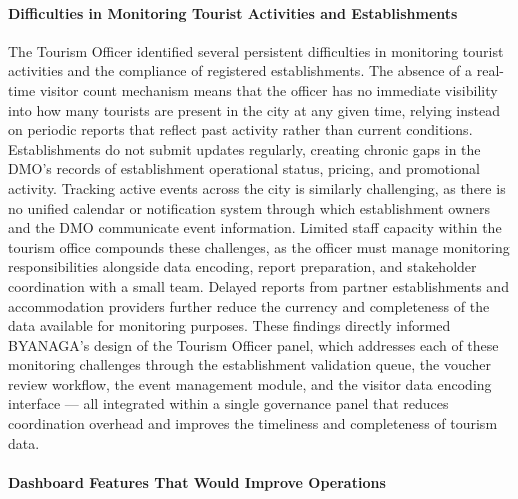 \documentclass{research}
\begin{document}

\paragraph{Difficulties in Monitoring Tourist Activities and Establishments}

The Tourism Officer identified several persistent difficulties in monitoring
tourist activities and the compliance of registered establishments. The
absence of a real-time visitor count mechanism means that the officer has no
immediate visibility into how many tourists are present in the city at any
given time, relying instead on periodic reports that reflect past activity
rather than current conditions. Establishments do not submit updates
regularly, creating chronic gaps in the DMO's records of establishment
operational status, pricing, and promotional activity. Tracking active events
across the city is similarly challenging, as there is no unified calendar or
notification system through which establishment owners and the DMO
communicate event information. Limited staff capacity within the tourism
office compounds these challenges, as the officer must manage monitoring
responsibilities alongside data encoding, report preparation, and stakeholder
coordination with a small team. Delayed reports from partner establishments
and accommodation providers further reduce the currency and completeness of
the data available for monitoring purposes. These findings directly informed
BYANAGA's design of the Tourism Officer panel, which addresses each of these
monitoring challenges through the establishment validation queue, the voucher
review workflow, the event management module, and the visitor data encoding
interface --- all integrated within a single governance panel that reduces
coordination overhead and improves the timeliness and completeness of
tourism data.


\paragraph{Dashboard Features That Would Improve Operations}
\end{document}
